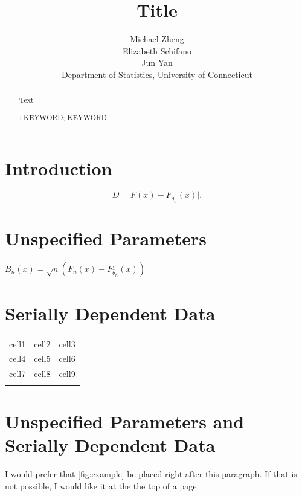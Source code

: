 \documentclass[12pt, letterpaper, titlepage]{article}
\title{Title}
\author{Michael Zheng\\
  Elizabeth Schifano\\
  Jun Yan\\[1ex]
  Department of Statistics, University of Connecticut\\
}
\date{}
\begin{document}
\maketitle

\doublespace

\begin{abstract}
Text

\bigskip
\noindent{}:
KEYWORD;
KEYWORD;
\end{abstract}

\section{Introduction}
\label{sec:intro}

\begin{equation}
  \label{eq:eq1}
  D = F(x) - F_{\hat\theta_n}(x) |.
\end{equation}

\section{Unspecified Parameters}
\label{sec:fitted}

$B_{n}(x) = \sqrt{n}(F_{n}(x) - F_{\hat\theta_n}(x))$

\section{Serially Dependent Data}
\label{sec:dependence}

\begin{center}
\begin{tabular}{ |c|c|c| } 
 \hline
 cell1 & cell2 & cell3 \\ 
 cell4 & cell5 & cell6 \\ 
 cell7 & cell8 & cell9 \\ 
 \hline
 \label{table:table1}
\end{tabular}
\end{center}

\section{Unspecified Parameters and Serially Dependent Data}
\label{sec:fittedwithdependence}

I would prefer that \autoref{fig:example} be placed right after this paragraph.
If that is not possible, I would like it at the the top of a page.
\end{document}
